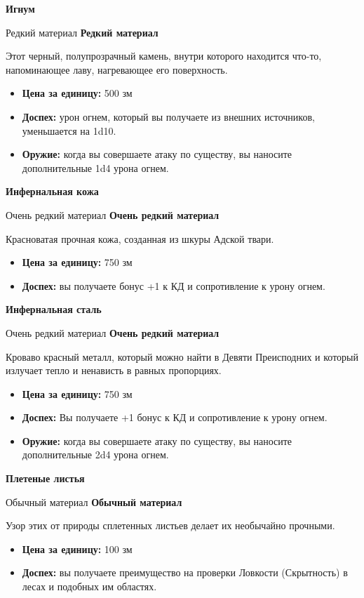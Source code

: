 \documentclass[a4paper, 9pt, twocolumn]{book}
\newcommand{\partc}[2][]{{
		\bigskip
		\noindent
		\hspace{-0.25cm}
		\fontsize{11pt}{13.2}
		\color{sectioncolor}
		\textbf{#2}}
	
	{
		\ifx\relax#1\relax
		\else
		\noindent
		\normalcolor
		\textbf{#1}}
	\bigskip
	\fi
}
\begin{document}
	\partc[Редкий материал]{Игнум}
	
	\noindent Этот черный, полупрозрачный камень, внутри которого находится что-то, напоминающее лаву, нагревающее его поверхность.
	
	\begin{itemize}
		\item \textbf{Цена за единицу:} 500 зм
		
		\item \textbf{Доспех:} урон огнем, который вы получаете из внешних источников, уменьшается на 1d10.
		
		\item \textbf{Оружие:} когда вы совершаете атаку по существу, вы наносите дополнительные 1d4 урона огнем.
	\end{itemize}

	\partc[Очень редкий материал]{Инфернальная кожа}
	
	\noindent Красноватая прочная кожа, созданная из шкуры Адской твари.
	
	\begin{itemize}
		\item \textbf{Цена за единицу:} 750 зм
		
		\item \textbf{Доспех:} вы получаете бонус +1 к КД и сопротивление к урону огнем.
	\end{itemize}

	\partc[Очень редкий материал]{Инфернальная сталь}
	
	\noindent Кроваво красный металл, который можно найти в Девяти Преисподних и который излучает тепло и ненависть в равных пропорциях.
	
	\begin{itemize}
		\item \textbf{Цена за единицу:} 750 зм
		
		\item \textbf{Доспех:} Вы получаете +1 бонус к КД и сопротивление к урону огнем.
		
		\item \textbf{Оружие:} когда вы совершаете атаку по существу, вы наносите дополнительные 2d4 урона огнем.
	\end{itemize}

	\partc[Обычный материал]{Плетеные листья}
	
	\noindent Узор этих от природы сплетенных листьев делает их необычайно прочными.
	
	\begin{itemize}
		\item \textbf{Цена за единицу:} 100 зм
		
		\item \textbf{Доспех:} вы получаете преимущество на проверки Ловкости (Скрытность) в лесах и подобных им областях.
	\end{itemize}
\end{document}
